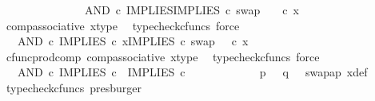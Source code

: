 \begin{isabellebody}
\ \ \ \ \ \ \ \ \ \ \ \ \ \ \ AND\ {\isasymcirc}\isactrlsub c\ {\isasymlangle}IMPLIES{\isacharcomma}{\kern0pt}IMPLIES\ {\isasymcirc}\isactrlsub c\ swap\ {\isasymOmega}\ {\isasymOmega}{\isasymrangle}\ \ {\isasymcirc}\isactrlsub c\ x{\isachardoublequoteclose}\isanewline
\ \ \ \ \ \ \ \ \ \ \isamarkupfalse%
\ comp{\isacharunderscore}{\kern0pt}associative{}\ x{\isacharunderscore}{\kern0pt}type\ \isamarkupfalse%
\ {\isacharparenleft}{\kern0pt}typecheck{\isacharunderscore}{\kern0pt}cfuncs{\isacharcomma}{\kern0pt}\ force{\isacharparenright}{\kern0pt}\isanewline
\ \ \ \ \ \ \ \ \isamarkupfalse%
\ \isamarkupfalse%
\ {\isachardoublequoteopen}{\isachardot}{\kern0pt}{\isachardot}{\kern0pt}{\isachardot}{\kern0pt}\ {\isacharequal}{\kern0pt}\ AND\ {\isasymcirc}\isactrlsub c\ {\isasymlangle}IMPLIES\ {\isasymcirc}\isactrlsub c\ x{\isacharcomma}{\kern0pt}IMPLIES\ {\isasymcirc}\isactrlsub c\ swap\ {\isasymOmega}\ {\isasymOmega}\ {\isasymcirc}\isactrlsub c\ x{\isasymrangle}{\isachardoublequoteclose}\isanewline
\ \ \ \ \ \ \ \ \ \ \isamarkupfalse%
\ cfunc{\isacharunderscore}{\kern0pt}prod{\isacharunderscore}{\kern0pt}comp\ comp{\isacharunderscore}{\kern0pt}associative{}\ x{\isacharunderscore}{\kern0pt}type\ \isamarkupfalse%
\ {\isacharparenleft}{\kern0pt}typecheck{\isacharunderscore}{\kern0pt}cfuncs{\isacharcomma}{\kern0pt}\ force{\isacharparenright}{\kern0pt}\isanewline
\ \ \ \ \ \ \ \ \isamarkupfalse%
\ \isamarkupfalse%
\ {\isachardoublequoteopen}{\isachardot}{\kern0pt}{\isachardot}{\kern0pt}{\isachardot}{\kern0pt}\ {\isacharequal}{\kern0pt}\ AND\ {\isasymcirc}\isactrlsub c\ {\isasymlangle}IMPLIES\ {\isasymcirc}\isactrlsub c\ {\isasymlangle}{\isasymt}{\isacharcomma}{\kern0pt}{\isasymf}{\isasymrangle}{\isacharcomma}{\kern0pt}\ IMPLIES\ {\isasymcirc}\isactrlsub c\ {\isasymlangle}{\isasymf}{\isacharcomma}{\kern0pt}{\isasymt}{\isasymrangle}{\isasymrangle}{\isachardoublequoteclose}\isanewline
\ \ \ \ \ \ \ \ \ \ \isamarkupfalse%
\ {\isacartoucheopen}p\ {\isacharequal}{\kern0pt}\ {\isasymt}{\isacartoucheclose}\ {\isacartoucheopen}q\ {\isacharequal}{\kern0pt}\ {\isasymf}{\isacartoucheclose}\ swap{\isacharunderscore}{\kern0pt}ap\ x{\isacharunderscore}{\kern0pt}def\ \isamarkupfalse%
\ {\isacharparenleft}{\kern0pt}typecheck{\isacharunderscore}{\kern0pt}cfuncs{\isacharcomma}{\kern0pt}\ presburger{\isacharparenright}{\kern0pt}\isanewline
\ \ \ \ \ \ \ \ \isamarkupfalse%
\ \isamarkupfalse%

\end{isabellebody}
